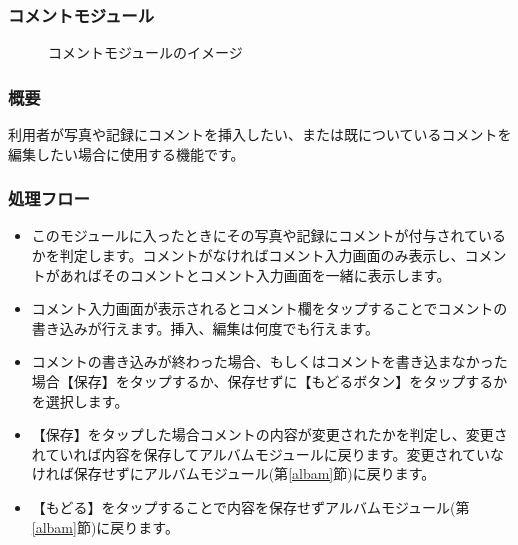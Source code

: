 \documentclass[a4j]{jarticle}
\begin{document}
\subsubsection{コメントモジュール\label{coment}}
\begin{figure}[H]
    \begin{center}
    \caption {コメントモジュールのイメージ}
    \label{functionselection}
    \end{center}
\end{figure}

\subsubsection*{概要}
利用者が写真や記録にコメントを挿入したい、または既についているコメントを編集したい場合に使用する機能です。

\subsubsection*{処理フロー}
\begin{itemize}
\item このモジュールに入ったときにその写真や記録にコメントが付与されているかを判定します。コメントがなければコメント入力画面のみ表示し、コメントがあればそのコメントとコメント入力画面を一緒に表示します。
\item コメント入力画面が表示されるとコメント欄をタップすることでコメントの書き込みが行えます。挿入、編集は何度でも行えます。
\item コメントの書き込みが終わった場合、もしくはコメントを書き込まなかった場合【保存】をタップするか、保存せずに【もどるボタン】をタップするかを選択します。
\item 【保存】をタップした場合コメントの内容が変更されたかを判定し、変更されていれば内容を保存してアルバムモジュールに戻ります。変更されていなければ保存せずにアルバムモジュール(第\ref{albam}節)に戻ります。
\item 【もどる】をタップすることで内容を保存せずアルバムモジュール(第\ref{albam}節)に戻ります。
\end{itemize}
\newpage
\end{document}
